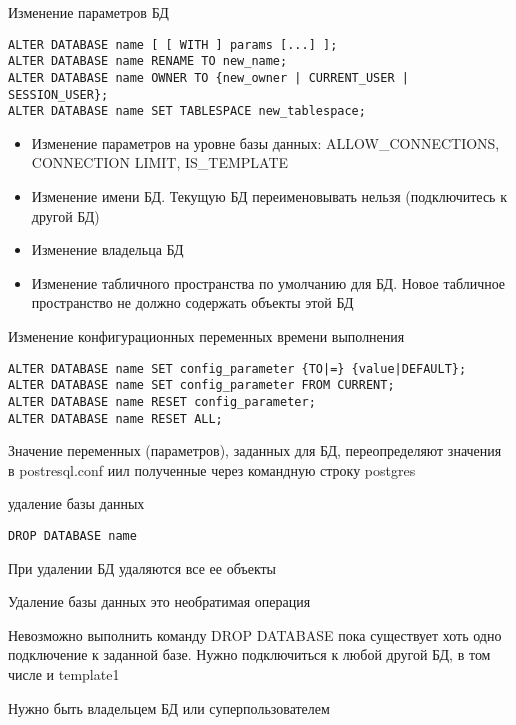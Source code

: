 \documentclass[12pt]{article}
\begin{document}
\begin{nota}{Изменение параметров БД}
\begin{lstlisting}
ALTER DATABASE name [ [ WITH ] params [...] ];
ALTER DATABASE name RENAME TO new_name;
ALTER DATABASE name OWNER TO {new_owner | CURRENT_USER | SESSION_USER};
ALTER DATABASE name SET TABLESPACE new_tablespace;
\end{lstlisting}

\begin{itemize}
    \item Изменение параметров на уровне базы данных: ALLOW\_CONNECTIONS, CONNECTION LIMIT, IS\_TEMPLATE
    \item Изменение имени БД. Текущую БД переименовывать нельзя (подключитесь к другой БД)
    \item Изменение владельца БД 
    \item Изменение табличного пространства по умолчанию для БД. Новое табличное пространство не должно содержать объекты этой БД
\end{itemize}
\end{nota}

\begin{nota}{Изменение конфигурационных переменных времени выполнения}
\begin{lstlisting}
ALTER DATABASE name SET config_parameter {TO|=} {value|DEFAULT};
ALTER DATABASE name SET config_parameter FROM CURRENT;
ALTER DATABASE name RESET config_parameter;
ALTER DATABASE name RESET ALL;
\end{lstlisting}

    Значение переменных (параметров), заданных для БД, переопределяют значения в postresql.conf иил полученные через командную строку postgres
\end{nota}

\begin{nota}{удаление базы данных}
\begin{lstlisting}
DROP DATABASE name
\end{lstlisting}

    При удалении БД удаляются все ее объекты 

    Удаление базы данных это необратимая операция 

    Невозможно выполнить команду DROP DATABASE пока существует хоть одно подключение к заданной базе. Нужно подключиться к любой другой БД, в том числе и template1 

    Нужно быть владельцем БД или суперпользователем 
\end{nota}
\end{document}
